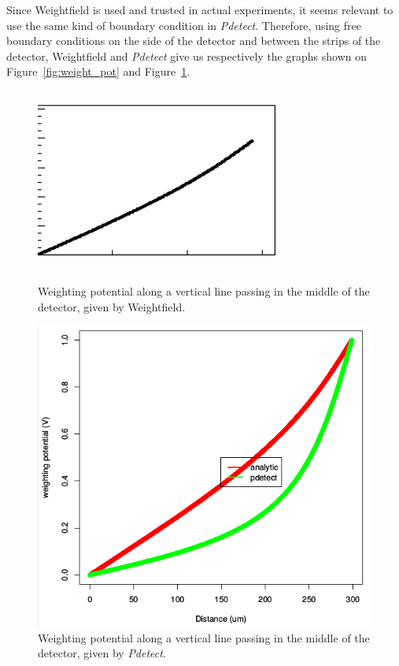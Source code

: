 \documentclass[11pt]{article}
\begin{document}
			Since Weightfield is used and trusted in actual experiments, it seems relevant to use the same kind
			of boundary condition in \textit{Pdetect}. Therefore, using free boundary conditions on the side of 
			the detector and between the strips of the detector, Weightfield and \textit{Pdetect} give us respectively
			the graphs shown on Figure~\ref{fig:weight_pot} and Figure~\ref{fig:free_conditions}.

			\begin{figure}[H]
				\begin{minipage}[b]{.46\linewidth}
					\center
					\includegraphics[height=6cm, width=8cm]{images/boundary_conditions/weight_pot.png}
					\caption{Weighting potential along a vertical line passing in the middle of the detector,
							given by Weightfield.}
					\label{fig:weight_pot}
				\end{minipage} \hfill
				\begin{minipage}[b]{.46\linewidth}
				\center
					\includegraphics[scale=0.4]{images/boundary_conditions/free_conditions.png}
					\caption{Weighting potential along a vertical line passing in the middle of the detector,
							given by \textit{Pdetect}.}
					\label{fig:free_conditions}
					\end{minipage}
			\end{figure}
\end{document}
